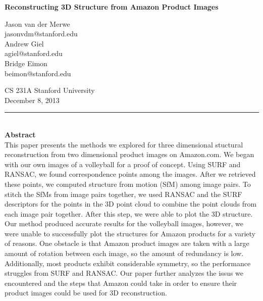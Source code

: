 \documentclass[12pt]{article}
\begin{document}
\begin{center}

{\Large \textbf{Reconstructing 3D Structure from Amazon Product Images}}

\begin{multicols}{3}
Jason van der Merwe\\
jasonvdm@stanford.edu\\
\columnbreak
Andrew Giel\\
agiel@stanford.edu\\
\columnbreak
Bridge Eimon\\
beimon@stanford.edu\\
\end{multicols}
CS 231A Stanford University\\
December 8, 2013\\
\end{center}
\noindent\rule{16.5cm}{0.4pt}\\
{\large \textbf{Abstract}}\\
This paper presents the methods we explored for three dimensional stuctural reconstruction from two dimensional product images on Amazon.com. We began with our own images of a volleyball for a proof of concept. Using SURF and RANSAC, we found correspondence points among the images. After we retrieved these points, we computed structure from motion (SfM) among image pairs. To stitch the SfMs from image pairs together, we used RANSAC and the SURF descriptors for the points in the 3D point cloud to combine the point clouds from each image pair together. After this step, we were able to plot the 3D structure. Our method produced accurate results for the volleyball images, however, we were unable to successfully plot the structures for Amazon products for a variety of reasons. One obstacle is that Amazon product images are taken with a large amount of rotation between each image, so the amount of redundancy is low. Additionally, most products exhibit considerable symmetry, so the performance struggles from SURF and RANSAC. Our paper further analyzes the issus we encountered and the steps that Amazon could take in order to ensure their product images could be used for 3D reconstruction.\\
\end{document}
